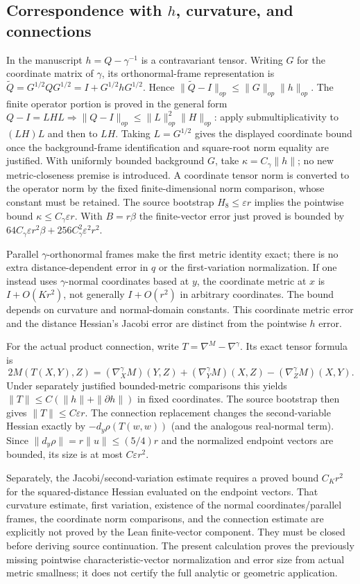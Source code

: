 \documentclass[11pt]{article}
\theoremstyle{definition}
\theoremstyle{remark}
\numberwithin{equation}{section}
\begin{document}
\subsection{Correspondence with \texorpdfstring{$h$}{h}, curvature, and connections}
In the manuscript $h=Q-\gamma^{-1}$ is a contravariant tensor.
Writing $G$ for the coordinate matrix of $\gamma$, its orthonormal-frame
representation is $\widetilde Q=G^{1/2}QG^{1/2}=I+G^{1/2}hG^{1/2}$.
Hence
$\|\widetilde Q-I\|_{op}\le\|G\|_{op}\|h\|_{op}$.
The finite operator portion is proved in the general form
$Q-I=LHL\Longrightarrow\|Q-I\|_{op}\le\|L\|_{op}^2\|H\|_{op}$:
apply submultiplicativity to $(LH)L$ and then to $LH$.
Taking $L=G^{1/2}$ gives the displayed coordinate bound once the
background-frame identification and square-root norm equality are justified.
With uniformly bounded background $G$, take
$\kappa=C_\gamma\|h\|$; no new metric-closeness premise is introduced.
A coordinate tensor norm is converted to the operator norm by the fixed
finite-dimensional norm comparison, whose constant must be retained.
The source bootstrap $H_8\le\varepsilon r$ implies the pointwise bound
$\kappa\le C_\gamma\varepsilon r$. With $B=r\beta$ the finite-vector
error just proved is bounded by
$64C_\gamma\varepsilon r^2\beta+256C_\gamma^2\varepsilon^2r^2$.

Parallel $\gamma$-orthonormal frames make the first metric identity exact;
there is no extra distance-dependent error in $q$ or the first-variation
normalization. If one instead uses $\gamma$-normal coordinates based at $y$,
the coordinate metric at $x$ is $I+O(Kr^2)$, not generally $I+O(r^2)$
in arbitrary coordinates. The bound depends on curvature and normal-domain
constants. This coordinate metric error and the distance Hessian's Jacobi
error are distinct from the pointwise $h$ error.

For the actual product connection, write
$T=\nabla^M-\nabla^\gamma$. Its exact tensor formula is
\[
 2M(T(X,Y),Z)=(\nabla^\gamma_X M)(Y,Z)
             +(\nabla^\gamma_Y M)(X,Z)
             -(\nabla^\gamma_Z M)(X,Y).
\]
Under separately justified bounded-metric comparisons this yields
$\|T\|\le C(\|h\|+\|\partial h\|)$ in fixed coordinates.
The source bootstrap then gives $\|T\|\le C\varepsilon r$.
The connection replacement changes the second-variable Hessian exactly
by $-d_y\rho(T(w,w))$ (and the analogous real-normal term).
Since $\|d_y\rho\|=r\|u\|\le(5/4)r$ and the normalized endpoint vectors
are bounded, its size is at most $C\varepsilon r^2$.

Separately, the Jacobi/second-variation estimate requires a proved bound
$C_K r^2$ for the squared-distance Hessian evaluated on the endpoint
vectors. That curvature estimate, first variation, existence of the normal
coordinates/parallel frames, the coordinate norm comparisons, and the
connection estimate are explicitly not proved by the Lean finite-vector
component. They must be closed before deriving source continuation.
The present calculation proves the previously missing pointwise
characteristic-vector normalization and error size from actual metric
smallness; it does not certify the full analytic or geometric application.
\end{document}
